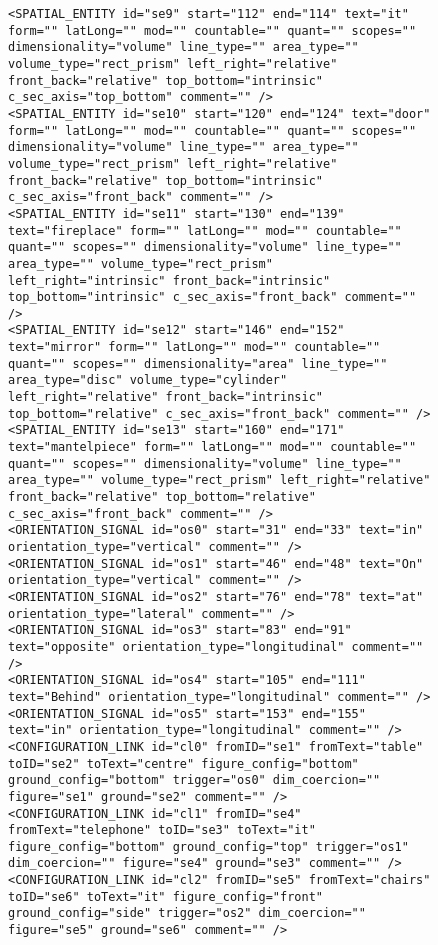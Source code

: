 \documentclass[11pt]{article}
\begin{document}
\begin{appendix}
\begin{figure}
\begin{verbatim}
<SPATIAL_ENTITY id="se9" start="112" end="114" text="it" form="" latLong="" mod="" countable="" quant="" scopes="" dimensionality="volume" line_type="" area_type="" volume_type="rect_prism" left_right="relative" front_back="relative" top_bottom="intrinsic" c_sec_axis="top_bottom" comment="" />
<SPATIAL_ENTITY id="se10" start="120" end="124" text="door" form="" latLong="" mod="" countable="" quant="" scopes="" dimensionality="volume" line_type="" area_type="" volume_type="rect_prism" left_right="relative" front_back="relative" top_bottom="intrinsic" c_sec_axis="front_back" comment="" />
<SPATIAL_ENTITY id="se11" start="130" end="139" text="fireplace" form="" latLong="" mod="" countable="" quant="" scopes="" dimensionality="volume" line_type="" area_type="" volume_type="rect_prism" left_right="intrinsic" front_back="intrinsic" top_bottom="intrinsic" c_sec_axis="front_back" comment="" />
<SPATIAL_ENTITY id="se12" start="146" end="152" text="mirror" form="" latLong="" mod="" countable="" quant="" scopes="" dimensionality="area" line_type="" area_type="disc" volume_type="cylinder" left_right="relative" front_back="intrinsic" top_bottom="relative" c_sec_axis="front_back" comment="" />
<SPATIAL_ENTITY id="se13" start="160" end="171" text="mantelpiece" form="" latLong="" mod="" countable="" quant="" scopes="" dimensionality="volume" line_type="" area_type="" volume_type="rect_prism" left_right="relative" front_back="relative" top_bottom="relative" c_sec_axis="front_back" comment="" />
<ORIENTATION_SIGNAL id="os0" start="31" end="33" text="in" orientation_type="vertical" comment="" />
<ORIENTATION_SIGNAL id="os1" start="46" end="48" text="On" orientation_type="vertical" comment="" />
<ORIENTATION_SIGNAL id="os2" start="76" end="78" text="at" orientation_type="lateral" comment="" />
<ORIENTATION_SIGNAL id="os3" start="83" end="91" text="opposite" orientation_type="longitudinal" comment="" />
<ORIENTATION_SIGNAL id="os4" start="105" end="111" text="Behind" orientation_type="longitudinal" comment="" />
<ORIENTATION_SIGNAL id="os5" start="153" end="155" text="in" orientation_type="longitudinal" comment="" />
<CONFIGURATION_LINK id="cl0" fromID="se1" fromText="table" toID="se2" toText="centre" figure_config="bottom" ground_config="bottom" trigger="os0" dim_coercion="" figure="se1" ground="se2" comment="" />
<CONFIGURATION_LINK id="cl1" fromID="se4" fromText="telephone" toID="se3" toText="it" figure_config="bottom" ground_config="top" trigger="os1" dim_coercion="" figure="se4" ground="se3" comment="" />
<CONFIGURATION_LINK id="cl2" fromID="se5" fromText="chairs" toID="se6" toText="it" figure_config="front" ground_config="side" trigger="os2" dim_coercion="" figure="se5" ground="se6" comment="" />

\end{verbatim}
\end{figure}
\end{appendix}
\end{document}
